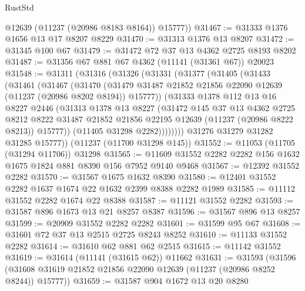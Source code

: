 \begin{lexlean}{RustStd}
\begin{coremodule}
        @12639
        (@11237 (@20986 @8183 @8164))
        @15777))
@31467 := @31333 @1376 @1656 @13 @17 @8207 @8229
@31470 := @31313 @1376 @13 @8207
@31472 := @31345 @100 @67
@31479 := @31472 @72 @37 @13 @4362 @2725 @8193 @8202
@31487 := @31356 @67 @881 @67 @4362 (@11141 (@31361 @67)) @20023
@31548 := @31311
    (@31316
      (@31326
        (@31331
          (@31377
            (@31405
              (@31433
                (@31461
                  (@31467
                    (@31470
                      (@31479
                        @31487
                        @21852
                        @21856
                        @22090
                        @12639
                        (@11237 (@20986 @8202 @8194))
                        @15777))
                    (@31333
                      @1378
                      @112
                      @13
                      @16
                      @8227
                      @2446
                      (@31313
                        @1378
                        @13
                        @8227
                        (@31472
                          @145
                          @37
                          @13
                          @4362
                          @2725
                          @8212
                          @8222
                          @31487
                          @21852
                          @21856
                          @22195
                          @12639
                          (@11237 (@20986 @8222 @8213))
                          @15777))
                      (@11405 @31298 @2282))))))))
        @31276
        @31279
        @31282
        @31285
        @15777))
    (@11237 (@11700 @31298 @145))
@31552 := @11053 (@11705 (@31294 @11706)) @31298
@31565 := @11609 @31552 @2282 @2282 @156 @1632 @1675 @1824 @881 @8390 @156 @7952 @9140 @9468
@31567 := @12392 @31552 @2282
@31570 := @31567 @1675 @1632 @8390
@31580 := @12401 @31552 @2282 @1637 @1674 @22 @1632 @2399 @8388 @2282 @1989
@31585 := @11112 @31552 @2282 @1674 @22 @8388
@31587 := @11121 @31552 @2282
@31593 := @31587 @896 @1673 @13 @21 @8257 @8387
@31596 := @31567 @896 @13 @8257
@31599 := @20909 @31552 @2282 @2282
@31601 := @31599 @95 @67
@31608 := @31601 @72 @37 @13 @2515 @2725 @8243 @8252
@31610 := @11133 @31552 @2282
@31614 := @31610 @62 @881 @62 @2515
@31615 := @11142 @31552
@31619 := @31614 (@11141 (@31615 @62)) @11662
@31631 := @31593
    (@31596 (@31608 @31619 @21852 @21856 @22090 @12639 (@11237 (@20986 @8252 @8244)) @15777))
@31659 := @31587
    @904
    @1672
    @13
    @20
    @8280

\end{coremodule}
\end{lexlean}
